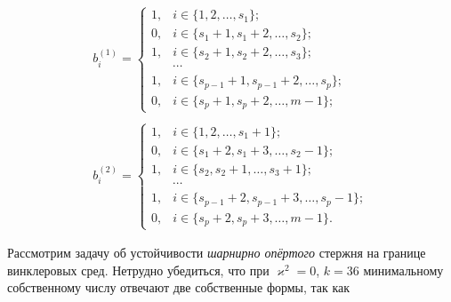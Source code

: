 \begin{itemize}
$$

\begin{array}{l}

b_i^{(1)}=

\begin{cases}

1, & i\in\{1, 2,\dots,s_1\};\\

0, & i\in\{s_1+1,s_1+2,\dots,s_2\};\\

1, & i\in\{s_2+1,s_2+2,\dots,s_3\};\\

& \cdots \\

1, & i\in\{s_{p-1}+1,s_{p-1}+2,\dots,s_p\};\\

0, & i\in\{s_p+1,s_p+2,\dots,m-1\};

\end{cases}\\

\\ 

b_i^{(2)}=

\begin{cases}

1, & i\in\{1, 2,\dots,s_1+1\};\\

0, & i\in\{s_1+2,s_1+3,\dots,s_2-1\};\\

1, & i\in\{s_2,s_2+1,\dots,s_3+1\};\\

& \cdots\\

1, & i\in\{s_{p-1}+2,s_{p-1}+3,\dots,s_p-1\};\\

0, & i\in\{s_p+2,s_p+3,\dots,m-1\}.

\end{cases}

\end{array}

$$

\end{itemize}




Рассмотрим задачу об устойчивости \textit{шарнирно опёртого} стержня на границе винклеровых сред. Нетрудно убедиться, что при $\varkappa^2=0$, $k=36$ минимальному собственному числу отвечают две собственные формы, так как 

